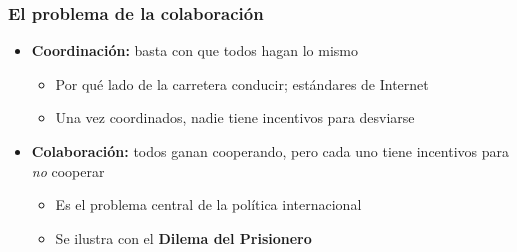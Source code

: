 \begin{frame}
\frametitle{El problema de la colaboración}
\centering

\begin{itemize}
  \item \textbf{Coordinación:} basta con que todos hagan lo mismo
  \begin{itemize}
    \item Por qué lado de la carretera conducir; estándares de Internet
    \item Una vez coordinados, nadie tiene incentivos para desviarse
  \end{itemize}
  \item<2-> \textbf{Colaboración:} todos ganan cooperando, pero cada uno tiene incentivos para \textit{no} cooperar
  \begin{itemize}
    \item Es el problema central de la política internacional
    \item Se ilustra con el \textbf{Dilema del Prisionero}
  \end{itemize}
\end{itemize}

\end{frame}

